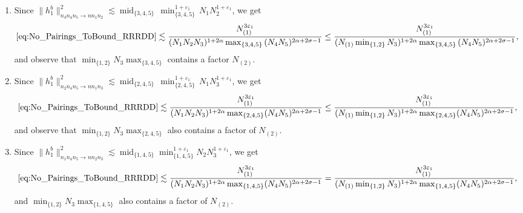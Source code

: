 \documentclass[11pt, xcolor = dvipsnames,reqno
]{amsart}
\theoremstyle{definition}
\theoremstyle{remark}
\begin{document}
\begin{itemize}
\begin{enumerate}
    \item Since $\lVert h^b_1 \rVert_{n_3n_4n_5 \to nn_1n_2}^2 \lesssim \operatorname{mid}_{\{3,4,5\}} \, \operatorname{min}_{\{3,4,5\}}^{1+\varepsilon_1} \, N_1N_2^{1+\varepsilon_1}$, we get 
    \begin{align}
        \eqref{eq:No_Pairings_ToBound_RRRDD}
        \lesssim 
        \frac{N_{(1)}^{3\varepsilon_1}}{(N_1N_2N_3)^{1+2\alpha} \max_{\{3,4,5\}} \, (N_4N_5)^{2\alpha + 2\sigma - 1}}
        \leq 
        \frac{N_{(1)}^{3\varepsilon_1}}{(N_{(1)} \min_{\{1,2\}} N_3)^{1+2\alpha} \max_{\{3,4,5\}} \, (N_4N_5)^{2\alpha + 2\sigma - 1}},
    \end{align}
    and observe that $\min_{\{1,2\}}N_3 \max_{\{3,4,5\}}$ contains a factor $N_{(2)}$.

    \item Since $\lVert h^b_1 \rVert_{n_2n_4n_5 \to nn_1n_3}^2 \lesssim \operatorname{mid}_{\{2,4,5\}} \, \operatorname{min}_{\{2,4,5\}}^{1+\varepsilon_1} \, N_1N_3^{1+\varepsilon_1}$, we get 
    \begin{align}
        \eqref{eq:No_Pairings_ToBound_RRRDD}
        \lesssim 
        \frac{ N_{(1)}^{3\varepsilon_1} }{(N_1N_2N_3)^{1 + 2\alpha} \max_{\{2,4,5\}} (N_4N_5)^{2\alpha + 2\sigma - 1}}
        \leq \frac{ N_{(1)}^{3\varepsilon_1} }{(N_{(1)} \min_{\{1,2\}}N_3)^{1 + 2\alpha} \max_{\{2,4,5\}} (N_4N_5)^{2\alpha + 2\sigma - 1}},  
    \end{align}
    and observe that $\min_{\{1,2\}}N_3 \max_{\{2,4,5\}}$ also contains a factor of $N_{(2)}$.

    
    \item Since $\lVert h^b_1 \rVert_{n_1n_4n_5 \to nn_2n_3}^2 \lesssim \operatorname{mid}_{\{1,4,5\}} \operatorname{min}_{\{1,4,5\}}^{1+\varepsilon_1} N_2 N_3^{1+\varepsilon_1}$, we get 
    \begin{align}
        \eqref{eq:No_Pairings_ToBound_RRRDD}
        \lesssim 
        \frac{N_{(1)}^{3\varepsilon_1}}{ (N_1N_2N_3)^{1 + 2\alpha} \max_{\{1,4,5\}} (N_4N_5)^{2\alpha + 2\sigma - 1}}
        =
        \frac{N_{(1)}^{3\varepsilon_1}}{ (N_{(1)} \min_{\{1,2\}} N_3)^{1 + 2\alpha} \max_{\{1,4,5\}} (N_4N_5)^{2\alpha + 2\sigma - 1}}, 
    \end{align}
    and $\min_{\{1,2\}}N_3 \max_{\{1,4,5\}}$ also contains a factor of $N_{(2)}$.


\end{enumerate}
\end{itemize}
\end{document}
